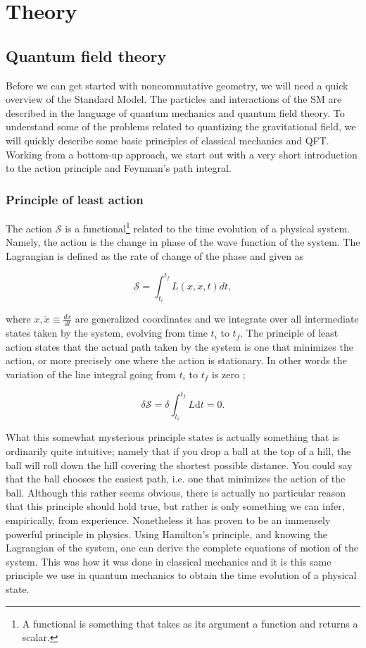 \section{Theory}
\subsection{Quantum field theory}
Before we can get started with noncommutative geometry, we will need a quick overview of the Standard Model. The particles and interactions of the SM are described in the language of quantum mechanics and quantum field theory. To understand some of the problems related to quantizing the gravitational field, we will quickly describe some basic principles of classical mechanics and QFT. Working from a bottom-up approach, we start out with a very short introduction to the action principle and Feynman's path integral.

\subsubsection{Principle of least action}
The action $\mathcal{S}$ is a functional\footnote{A functional is something that takes as its argument a function and returns a scalar.} related to the time evolution of a physical system. Namely, the action is the change in phase of the wave function of the system. The Lagrangian is defined as the rate of change of the phase and given as 

\begin{equation}\label{eq:S}
	\mathcal{S} = \int_{t_i}^{t_f} L(x,\dot{x},t)dt,
\end{equation}

where $x, \dot{x} \equiv \frac{dx}{dt}$ are generalized coordinates and we integrate over all intermediate states taken by the system, evolving from time $t_i$ to $t_f$. The principle of least action states that the actual path taken by the system is one that minimizes the action, or more precisely one where the action is stationary. In other words the variation of the line integral going from $t_i$ to $t_f$ is zero \cite{goldstein1959};

\begin{equation}
	\delta \mathcal{S} = \delta \int_{t_i}^{t_f} L \textrm{d}t = 0.
\end{equation}

What this somewhat mysterious principle states is actually something that is ordinarily quite intuitive; namely that if you drop a ball at the top of a hill, the ball will roll down the hill covering the shortest possible distance. You could say that the ball chooses the easiest path, i.e. one that minimizes the action of the ball. Although this rather seems obvious, there is actually no particular reason that this principle should hold true, but rather is only something we can infer, empirically, from experience. Nonetheless it has proven to be an immensely powerful principle in physics. Using Hamilton's principle, and knowing the Lagrangian of the system, one can derive the complete equations of motion of the system. This was how it was done in classical mechanics and it is this same principle we use in quantum mechanics to obtain the time evolution of a physical state.


